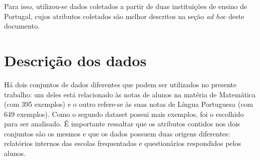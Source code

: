 \documentclass[]{IEEEphot}
\begin{document}
Para isso, utilizou-se dados coletados a partir de duas instituições de ensino de Portugal, cujos atributos coletados são melhor descritos na seção \textit{ad hoc} deste documento.

\section{Descrição dos dados}

Há dois conjuntos de dados diferentes que podem ser utilizados no presente trabalho: um deles está relacionado às notas de alunos na matéria de Matemática (com 395 exemplos) e o outro refere-se às suas notas de Língua Portuguesa (com 649 exemplos). Como o segundo dataset possui mais exemplos, foi o escolhido para ser analisado. É importante ressaltar que os atributos contidos nos dois conjuntos são os mesmos e que os dados possuem duas origens diferentes: relatórios internos das escolas frequentadas e questionários respondidos pelos alunos.
\end{document}
